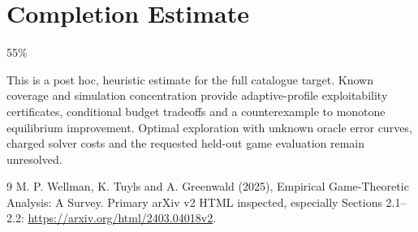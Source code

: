 \documentclass[11pt]{article}
\begin{document}
\section{Completion Estimate}
55\%

This is a post hoc, heuristic estimate for the full catalogue target.
Known coverage and simulation concentration provide adaptive-profile exploitability certificates, conditional budget tradeoffs and a counterexample to monotone equilibrium improvement. Optimal exploration with unknown oracle error curves, charged solver costs and the requested held-out game evaluation remain unresolved.

\begin{thebibliography}{9}
 M. P. Wellman, K. Tuyls and A. Greenwald (2025), Empirical Game-Theoretic Analysis: A Survey. Primary arXiv v2 HTML inspected, especially Sections 2.1--2.2:
\url{https://arxiv.org/html/2403.04018v2}.
\end{thebibliography}
\end{document}
